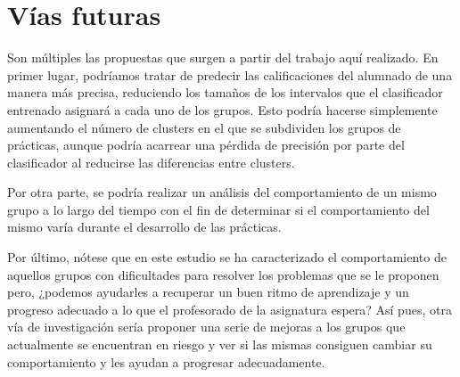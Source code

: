 \chapter{Vías futuras}\label{sec:chapterXV}

Son múltiples las propuestas que surgen a partir del trabajo aquí realizado. En primer lugar, podríamos tratar de predecir las calificaciones del alumnado de una manera más precisa, reduciendo los tamaños de los intervalos que el clasificador entrenado asignará a cada uno de los grupos. Esto podría hacerse simplemente aumentando el número de clusters en el que se subdividen los grupos de prácticas, aunque podría acarrear una pérdida de precisión por parte del clasificador al reducirse las diferencias entre clusters.

Por otra parte, se podría realizar un análisis del comportamiento de un mismo grupo a lo largo del tiempo con el fin de determinar si el comportamiento del mismo varía durante el desarrollo de las prácticas.

Por último, nótese que en este estudio se ha caracterizado el comportamiento de aquellos grupos con dificultades para resolver los problemas que se le proponen pero, ¿podemos ayudarles a recuperar un buen ritmo de aprendizaje y un progreso adecuado a lo que el profesorado de la asignatura espera? Así pues, otra vía de investigación sería proponer una serie de mejoras a los grupos que actualmente se encuentran en riesgo y ver si las mismas consiguen cambiar su comportamiento y les ayudan a progresar adecuadamente.